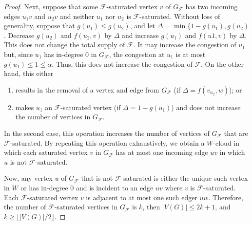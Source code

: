 \documentclass{patmorin}
\begin{document}
\begin{proof}
   Next, suppose that some $\mathcal{F}$-saturated vertex $v$ of $G_\mathcal{F}$ has two incoming edges $u_1v$ and $u_2v$ and neither $u_1$ nor $u_2$ is $\mathcal{F}$-saturated.  Without loss of generality, suppose that $g(u_1)\le g(u_2)$, and let $\Delta=\min\{1-g(u_1),g(u_2)$.  Decrease $g(u_2)$ and $f(u_2,v)$ by $\Delta$ and increase $g(u_1)$ and $f(u1,v)$ by $\Delta$.  This does not change the total supply of $\mathcal{F}$.  It may increase the congestion of $u_1$ but, since $u_1$ has in-degree $0$ in $G_\mathcal{F}$, the congestion at $u_1$ is at most $g(u_1)\le 1\le \alpha$.  Thus, this does not increase the congestion of $\mathcal{F}$.  On the other hand, this either
   \begin{enumerate}
     \item results in the removal of a vertex and edge from $G_\mathcal{F}$ (if $\Delta=f(v_{u_2},w)$); or
     \item makes $u_1$ an $\mathcal{F}$-saturated vertex (if $\Delta=1-g(u_1)$) and does not increase the number of vertices in $G_\mathcal{F}$.
  \end{enumerate}
  In the second case, this operation increases the number of vertices of $G_{\mathcal{F}}$ that are $\mathcal{F}$-saturated.  By repeating this operation exhaustively, we obtain a $W$-cloud in which each saturated vertex $v$ in $G_{\mathcal{F}}$ has at most one incoming edge $uv$ in which $u$ is not $\mathcal{F}$-saturated.

   Now, any vertex $u$ of $G_{\mathcal{F}}$ that is not $\mathcal{F}$-saturated is either the unique such vertex in $W$ or has in-degree $0$ and is incident to an edge $uv$ where $v$ is $\mathcal{F}$-saturated. Each $\mathcal{F}$-saturated vertex $v$ is adjacent to at most one such edger $uw$. Therefore, the number of $\mathcal{F}$-saturated vertices in $G_{\mathcal{F}}$ is $k$, then $|V(G)|\le 2k+1$, and $k\ge\lfloor |V(G)|/2\rfloor$.
\end{proof}






\end{document}
